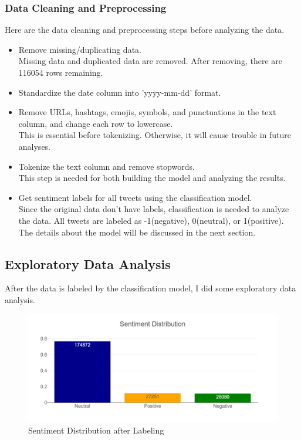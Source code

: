 \documentclass{article}
\begin{document}
\subsubsection{Data Cleaning and Preprocessing}
Here are the data cleaning and preprocessing steps before analyzing the data.
\begin{itemize}
    \item Remove missing/duplicating data.\\
    Missing data and duplicated data are removed. After removing, there are 116054 rows remaining.
    \item Standardize the date column into 'yyyy-mm-dd' format.
    \item Remove URLs, hashtags, emojis, symbols, and punctuations in the text column, and change each row to lowercase. \\
    This is essential before tokenizing. Otherwise, it will cause trouble in future analyses.
    \item Tokenize the text column and remove stopwords.\\
    This step is needed for both building the model and analyzing the results.
    \item Get sentiment labels for all tweets using the classification model.\\
    Since the original data don't have labels, classification is needed to analyze the data. All tweets are labeled as -1(negative), 0(neutral), or 1(positive). The details about the model will be discussed in the next section.
\end{itemize}

\subsection{Exploratory Data Analysis}
After the data is labeled by the classification model, I did some exploratory data analysis. 

\begin{figure}[H]
\centering
\includegraphics[width=15cm]{EDA1.png}
\caption{Sentiment Distribution after Labeling}
\end{figure}
\end{document}
